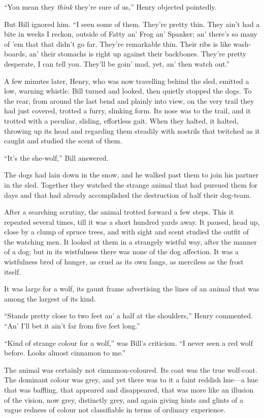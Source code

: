 \documentclass[10pt]{book}
\begin{document}
“You mean they \emph{think} they’re sure of us,” Henry objected pointedly.

But Bill ignored him. “I seen some of them. They’re pretty thin. They
ain’t had a bite in weeks I reckon, outside of Fatty an’ Frog an’
Spanker; an’ there’s so many of ’em that that didn’t go far. They’re
remarkable thin. Their ribs is like wash-boards, an’ their stomachs is
right up against their backbones. They’re pretty desperate, I can tell
you. They’ll be goin’ mad, yet, an’ then watch out.”

A few minutes later, Henry, who was now travelling behind the sled,
emitted a low, warning whistle. Bill turned and looked, then quietly
stopped the dogs. To the rear, from around the last bend and plainly
into view, on the very trail they had just covered, trotted a furry,
slinking form. Its nose was to the trail, and it trotted with a
peculiar, sliding, effortless gait. When they halted, it halted,
throwing up its head and regarding them steadily with nostrils that
twitched as it caught and studied the scent of them.

“It’s the she-wolf,” Bill answered.

The dogs had lain down in the snow, and he walked past them to join his
partner in the sled. Together they watched the strange animal that had
pursued them for days and that had already accomplished the destruction
of half their dog-team.

After a searching scrutiny, the animal trotted forward a few steps.
This it repeated several times, till it was a short hundred yards away.
It paused, head up, close by a clump of spruce trees, and with sight
and scent studied the outfit of the watching men. It looked at them in
a strangely wistful way, after the manner of a dog; but in its
wistfulness there was none of the dog affection. It was a wistfulness
bred of hunger, as cruel as its own fangs, as merciless as the frost
itself.

It was large for a wolf, its gaunt frame advertising the lines of an
animal that was among the largest of its kind.

“Stands pretty close to two feet an’ a half at the shoulders,” Henry
commented. “An’ I’ll bet it ain’t far from five feet long.”

“Kind of strange colour for a wolf,” was Bill’s criticism. “I never
seen a red wolf before. Looks almost cinnamon to me.”

The animal was certainly not cinnamon-coloured. Its coat was the true
wolf-coat. The dominant colour was grey, and yet there was to it a
faint reddish hue—a hue that was baffling, that appeared and
disappeared, that was more like an illusion of the vision, now grey,
distinctly grey, and again giving hints and glints of a vague redness
of colour not classifiable in terms of ordinary experience.
\end{document}
